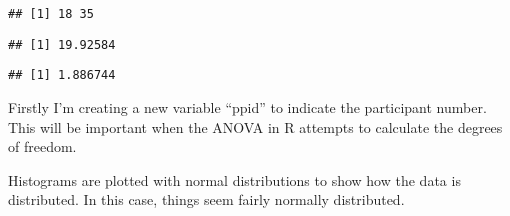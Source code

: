 \documentclass[]{article}
\newenvironment{Shaded}{\begin{snugshade}}{\end{snugshade}}
\newcommand{\KeywordTok}[1]{\textcolor[rgb]{0.13,0.29,0.53}{\textbf{#1}}}
\newcommand{\DataTypeTok}[1]{\textcolor[rgb]{0.13,0.29,0.53}{#1}}
\newcommand{\DecValTok}[1]{\textcolor[rgb]{0.00,0.00,0.81}{#1}}
\newcommand{\StringTok}[1]{\textcolor[rgb]{0.31,0.60,0.02}{#1}}
\newcommand{\CommentTok}[1]{\textcolor[rgb]{0.56,0.35,0.01}{\textit{#1}}}
\newcommand{\OperatorTok}[1]{\textcolor[rgb]{0.81,0.36,0.00}{\textbf{#1}}}
\newcommand{\NormalTok}[1]{#1}
\begin{document}
\begin{verbatim}
## [1] 18 35
\end{verbatim}

\begin{Shaded}
\end{Shaded}

\begin{verbatim}
## [1] 19.92584
\end{verbatim}

\begin{Shaded}
\end{Shaded}

\begin{verbatim}
## [1] 1.886744
\end{verbatim}

Firstly I'm creating a new variable ``ppid'' to indicate the participant
number. This will be important when the ANOVA in R attempts to calculate
the degrees of freedom.

Histograms are plotted with normal distributions to show how the data is
distributed. In this case, things seem fairly normally distributed.

\begin{Shaded}
\end{Shaded}
\end{document}
